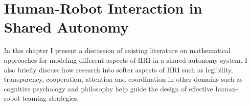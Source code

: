 \documentclass[12pt]{article}
\newcommand{\DGc}[1]{{\textbf{\color{blue}{#1}}}}
\newcommand{\POINTS}[1]{{\textbf{\color{red}{#1}}}}
\begin{document}






\pagebreak

\section{Human-Robot Interaction in Shared Autonomy}
\label{sec:HRI_SA}

In this chapter I present a discussion of existing literature on mathematical approaches for modeling different aspects of HRI in a shared autonomy system.  
I also briefly discuss how research into softer aspects of HRI such as legibility, transparency, cooperation, attention and coordination in other domains such as cognitive psychology and philosophy help guide the design of effective human-robot teaming strategies. 

\end{document}
